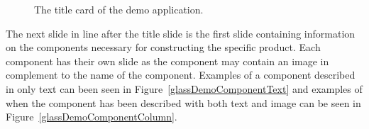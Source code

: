 	\begin{figure}[ht!]
		\centering
   		 \qquad
   		 \qquad
		\caption{The title card of the demo application.}
		\label{glassDemoTitleCard}
	\end{figure}
	
The next slide in line after the title slide is the first slide containing information on the components necessary for constructing the specific product. Each component has their own slide as the component may contain an image in complement to the name of the component. Examples of a component described in only text can been seen in Figure~\ref{glassDemoComponentText} and examples of when the component has been described with both text and image can be seen in Figure~\ref{glassDemoComponentColumn}.

